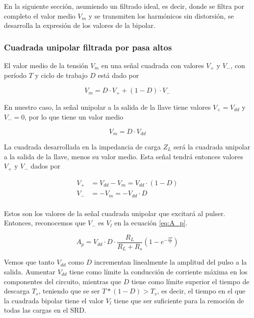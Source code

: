 En la siguiente sección, asumiendo un filtrado ideal, es decir, donde se filtra
por completo el valor medio $V_m$ y se transmiten los harmónicos sin distorsión,
se desarrolla la expresión de los valores de la bipolar.

\subsubsection{Cuadrada unipolar filtrada por pasa altos}

El valor medio de la tensión $V_m$ en una señal cuadrada con valores $V_+$ y
$V_-$, con período $T$ y ciclo de trabajo $D$ está dado por

\begin{equation}
    V_m = D \cdot V_+ + (1-D) \cdot V_-
\end{equation}

En nuestro caso, la señal unipolar a la salida de la llave tiene valores
$V_+=V_{dd}$ y $V_-=0$, por lo que tiene un valor medio

\begin{equation}
    \label{eq:v_minus_ideal_load}
    V_m = D \cdot V_{dd}
\end{equation}

La cuadrada desarrollada en la impedancia de carga $Z_L$ será la cuadrada
unipolar a la salida de la llave, menos su valor medio. Esta señal tendrá
entonces valores $V_+$ y $V_-$ dados por

\begin{equation}
    \label{eq:square_linear_load_highpassed_values}
    \begin{aligned}
        V_+ &= V_{dd}-V_m = V_{dd} \cdot (1-D) \\
        V_- &= -V_m = -V_{dd} \cdot D \\
    \end{aligned}
\end{equation}

Estos son los valores de la señal cuadrada unipolar que excitará al pulser.
Entonces, reconocemos que $V_-$ es $V_l$ en la ecuación \ref{eq:A_p}.

\begin{equation}
    A_p = V_{dd} \cdot D \cdot \frac{R_L}{R_L+R_s} \left( 1-e^{-\frac{2T}{\tau}}\right)
\end{equation}

Vemos que tanto $V_{dd}$ como $D$ incrementan linealmente la amplitud del pulso
a la salida. Aumentar $V_{dd}$ tiene como límite la conducción de corriente
máxima en los componentes del circuito, mientras que $D$ tiene como límite
superior el tiempo de descarga $T_s$, teniendo que se ser $T*(1-D) > T_s$, es
decir, el tiempo en el que la cuadrada bipolar tiene el valor $V_l$ tiene que
ser suficiente para la remoción de todas las cargas en el SRD.

